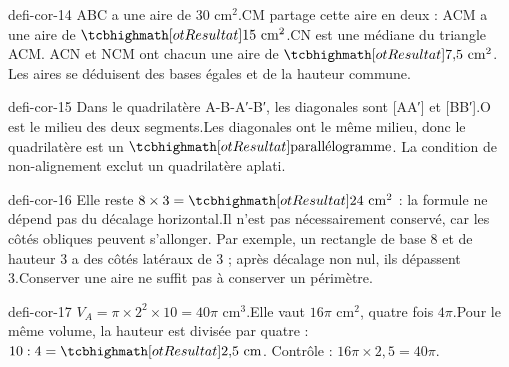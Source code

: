 \begin{blocEdition}{defi-cor-14}
ABC a une aire de 30 cm$^2$.CM partage cette aire en deux : ACM a une aire de $\res{15\ \mathrm{cm}^2}$.CN est une médiane du triangle ACM. ACN et NCM ont chacun une aire de $\res{7{,}5\ \mathrm{cm}^2}$. Les aires se déduisent des bases égales et de la hauteur commune.\label{fig-defi-cor-14}

\end{blocEdition}
\begin{blocEdition}{defi-cor-15}
Dans le quadrilatère A-B-A′-B′, les diagonales sont [AA′] et [BB′].O est le milieu des deux segments.Les diagonales ont le même milieu, donc le quadrilatère est un $\res{\text{parallélogramme}}$. La condition de non-alignement exclut un quadrilatère aplati.\label{fig-defi-cor-15}

\end{blocEdition}
\begin{blocEdition}{defi-cor-16}
Elle reste $8\times3=\res{24\ \mathrm{cm}^2}$ : la formule ne dépend pas du décalage horizontal.Il n’est pas nécessairement conservé, car les côtés obliques peuvent s’allonger. Par exemple, un rectangle de base 8 et de hauteur 3 a des côtés latéraux de 3 ; après décalage non nul, ils dépassent 3.Conserver une aire ne suffit pas à conserver un périmètre.\label{fig-defi-cor-16}

\end{blocEdition}
\begin{blocEdition}{defi-cor-17}
$V_A=\pi\times2^2\times10=40\pi$ cm$^3$.Elle vaut $16\pi$ cm$^2$, quatre fois $4\pi$.Pour le même volume, la hauteur est divisée par quatre : $10:4=\res{2{,}5\ \mathrm{cm}}$. Contrôle : $16\pi\times2{,}5=40\pi$.\label{fig-defi-cor-17}

\end{blocEdition}
